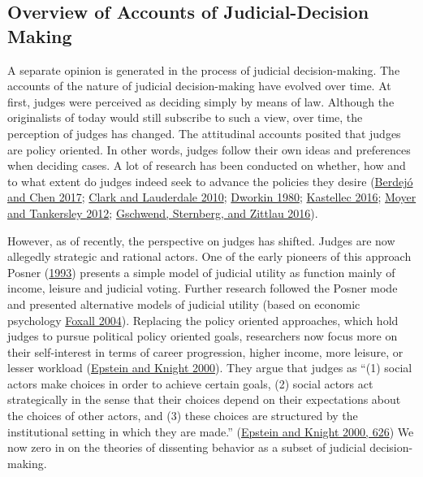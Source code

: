 \documentclass[
  11pt,
]{article}
\begin{document}
\hypertarget{accounts}{%
\subsection{Overview of Accounts of Judicial-Decision
Making}\label{accounts}}

A separate opinion is generated in the process of judicial
decision-making. The accounts of the nature of judicial decision-making
have evolved over time. At first, judges were perceived as deciding
simply by means of law. Although the originalists of today would still
subscribe to such a view, over time, the perception of judges has
changed. The attitudinal accounts posited that judges are policy
oriented. In other words, judges follow their own ideas and preferences
when deciding cases. A lot of research has been conducted on whether,
how and to what extent do judges indeed seek to advance the policies
they desire
(\protect\hyperlink{ref-berdejoElectoralCyclesUS2017}{Berdejó and Chen
2017}; \protect\hyperlink{ref-clarkLocatingSupremeCourt2010}{Clark and
Lauderdale 2010};
\protect\hyperlink{ref-dworkinPoliticalJudgesRule1980}{Dworkin 1980};
\protect\hyperlink{ref-kastellecEmpiricallyEvaluatingCountermajoritarian2016}{Kastellec
2016}; \protect\hyperlink{ref-moyerJudicialInnovationSexual2012}{Moyer
and Tankersley 2012};
\protect\hyperlink{ref-gschwendAreJudgesPolitical2016}{Gschwend,
Sternberg, and Zittlau 2016}).

However, as of recently, the perspective on judges has shifted. Judges
are now allegedly strategic and rational actors. One of the early
pioneers of this approach Posner
(\protect\hyperlink{ref-posnerWhatJudgesJustices1993}{1993}) presents a
simple model of judicial utility as function mainly of income, leisure
and judicial voting. Further research followed the Posner mode and
presented alternative models of judicial utility (based on economic
psychology \protect\hyperlink{ref-foxallWhatJudgesMaximize2004}{Foxall
2004}). Replacing the policy oriented approaches, which hold judges to
pursue political policy oriented goals, researchers now focus more on
their self-interest in terms of career progression, higher income, more
leisure, or lesser workload
(\protect\hyperlink{ref-epsteinStrategicRevolutionJudicial2000}{Epstein
and Knight 2000}). They argue that judges as ``(1) social actors make
choices in order to achieve certain goals, (2) social actors act
strategically in the sense that their choices depend on their
expectations about the choices of other actors, and (3) these choices
are structured by the institutional setting in which they are made.''
(\protect\hyperlink{ref-epsteinStrategicRevolutionJudicial2000}{Epstein
and Knight 2000, 626}) We now zero in on the theories of dissenting
behavior as a subset of judicial decision-making.
\end{document}
